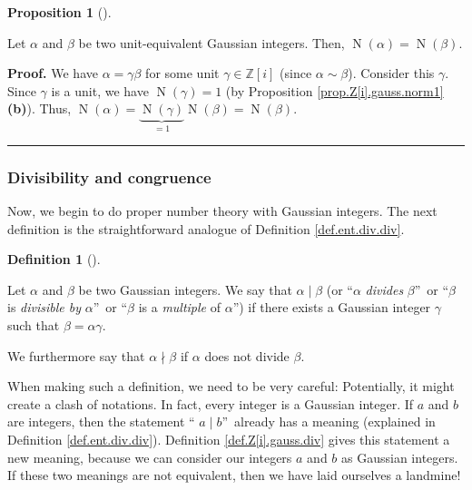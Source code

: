 \documentclass[numbers=enddot,12pt,final,onecolumn,notitlepage]{scrartcl}%
\numberwithin{exer}{subsection}
\theoremstyle{definition}
\newtheorem{prop}[theo]{Proposition}
\newenvironment{proposition}[1][]
{\begin{prop}[#1]\begin{leftbar}}
{\end{leftbar}\end{prop}}
\newtheorem{defi}[theo]{Definition}
\newenvironment{definition}[1][]
{\begin{defi}[#1]\begin{leftbar}}
{\end{leftbar}\end{defi}}
\newenvironment{proof}[1][Proof]{\noindent\textbf{#1.} }{\ \rule{0.5em}{0.5em}}
\begin{document}
\begin{proposition}
\label{prop.Z[i].gauss.uniteq.norm=norm}Let $\alpha$ and $\beta$ be two
unit-equivalent Gaussian integers. Then, $\operatorname*{N}\left(
\alpha\right)  =\operatorname*{N}\left(  \beta\right)  $.
\end{proposition}

\begin{proof}
We have $\alpha=\gamma\beta$ for some unit $\gamma\in\mathbb{Z}\left[
i\right]  $ (since $\alpha\sim\beta$). Consider this $\gamma$. Since $\gamma$
is a unit, we have $\operatorname*{N}\left(  \gamma\right)  =1$ (by
Proposition \ref{prop.Z[i].gauss.norm1} \textbf{(b)}). Thus,
$\operatorname*{N}\left(  \alpha\right)  =\underbrace{\operatorname*{N}\left(
\gamma\right)  }_{=1}\operatorname*{N}\left(  \beta\right)  =\operatorname*{N}%
\left(  \beta\right)  $.
\end{proof}

\subsubsection{Divisibility and congruence}

Now, we begin to do proper number theory with Gaussian integers. The next
definition is the straightforward analogue of Definition \ref{def.ent.div.div}.

\begin{definition}
\label{def.Z[i].gauss.div}Let $\alpha$ and $\beta$ be two Gaussian integers.
We say that $\alpha\mid\beta$ (or \textquotedblleft$\alpha$ \textit{divides}
$\beta$\textquotedblright\ or \textquotedblleft$\beta$ is \textit{divisible by
}$\alpha$\textquotedblright\ or \textquotedblleft$\beta$ is a
\textit{multiple} of $\alpha$\textquotedblright) if there exists a Gaussian
integer $\gamma$ such that $\beta=\alpha\gamma$.

We furthermore say that $\alpha\nmid\beta$ if $\alpha$ does not divide $\beta$.
\end{definition}

When making such a definition, we need to be very careful: Potentially, it
might create a clash of notations. In fact, every integer is a Gaussian
integer. If $a$ and $b$ are integers, then the statement \textquotedblleft%
$a\mid b$\textquotedblright\ already has a meaning (explained in Definition
\ref{def.ent.div.div}). Definition \ref{def.Z[i].gauss.div} gives this
statement a new meaning, because we can consider our integers $a$ and $b$ as
Gaussian integers. If these two meanings are not equivalent, then we have laid
ourselves a landmine!
\end{document}
